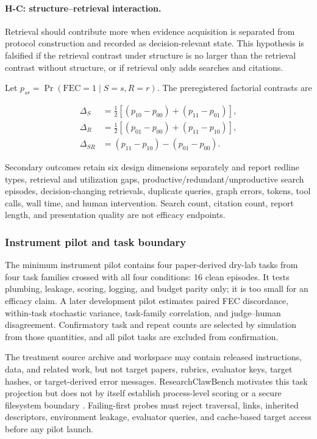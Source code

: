 \documentclass[11pt,a4paper]{article}
\begin{document}
\paragraph{H-C: structure--retrieval interaction.}
Retrieval should contribute more when evidence acquisition is separated from
protocol construction and recorded as decision-relevant state.  This hypothesis
is falsified if the retrieval contrast under structure is no larger than the
retrieval contrast without structure, or if retrieval only adds searches and
citations.

Let $p_{sr}=\Pr(\mathrm{FEC}=1\mid S=s,R=r)$.  The preregistered factorial
contrasts are

\begin{align}
\Delta_S &= \tfrac12[(p_{10}-p_{00})+(p_{11}-p_{01})],\\
\Delta_R &= \tfrac12[(p_{01}-p_{00})+(p_{11}-p_{10})],\\
\Delta_{SR} &= (p_{11}-p_{10})-(p_{01}-p_{00}).
\end{align}

Secondary outcomes retain six design dimensions separately and report redline
types, retrieval and utilization gaps, productive/redundant/unproductive search
episodes, decision-changing retrievals, duplicate queries, graph errors, tokens,
tool calls, wall time, and human intervention.  Search count, citation count,
report length, and presentation quality are not efficacy endpoints.

\subsubsection{Instrument pilot and task boundary}

The minimum instrument pilot contains four paper-derived dry-lab tasks from four
task families crossed with all four conditions: 16 clean episodes.  It tests
plumbing, leakage, scoring, logging, and budget parity only; it is too small for
an efficacy claim.  A later development pilot estimates paired FEC discordance,
within-task stochastic variance, task-family correlation, and judge--human
disagreement.  Confirmatory task and repeat counts are selected by simulation
from those quantities, and all pilot tasks are excluded from confirmation.

The treatment source archive and workspace may contain released instructions,
data, and related work, but not target papers, rubrics, evaluator keys, target
hashes, or target-derived error messages.  ResearchClawBench motivates this task
projection but does not by itself establish process-level scoring or a secure
filesystem boundary \citep{researchclawbench2026}.  Failing-first probes must
reject traversal, links, inherited descriptors, environment leakage, evaluator
queries, and cache-based target access before any pilot launch.
\end{document}
